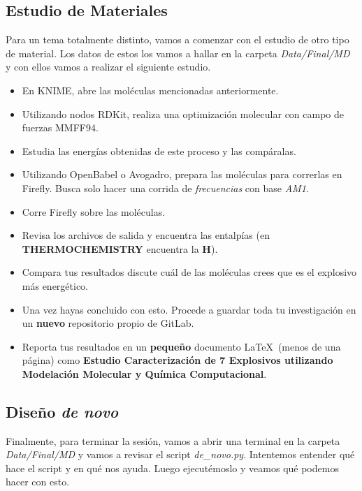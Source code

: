 \documentclass[10pt,letterpaper]{article}
\begin{document}
\subsection{Estudio de Materiales}
Para un tema totalmente distinto, vamos a comenzar con el estudio de otro tipo de material. Los datos de estos los vamos a hallar en la carpeta \textit{Data/Final/MD} y con ellos vamos a realizar el siguiente estudio.

\begin{itemize}
\item En KNIME, abre las mol\'eculas mencionadas anteriormente.
\item Utilizando nodos RDKit, realiza una optimizaci\'on molecular con campo de fuerzas MMFF94.
\item Estudia las energ\'ias obtenidas de este proceso y las comp\'aralas.
\item Utilizando OpenBabel o Avogadro, prepara las mol\'eculas para correrlas en Firefly. Busca solo hacer una corrida de \emph{frecuencias} con base \emph{AM1}.
\item Corre Firefly sobre las mol\'eculas.
\item Revisa los archivos de salida y encuentra las entalp\'ias (en \textbf{THERMOCHEMISTRY} encuentra la \textbf{H}).
\item Compara tus resultados discute cu\'al de las mol\'eculas crees que es el explosivo m\'as energ\'etico.
\item Una vez hayas concluido con esto. Procede a guardar toda tu investigaci\'on en un \textbf{nuevo} repositorio propio de GitLab.
\item Reporta tus resultados en un \textbf{peque\~no} documento \LaTeX\ (menos de una p\'agina) como \textbf{Estudio Caracterizaci\'on de 7 Explosivos utilizando Modelaci\'on Molecular y Qu\'imica Computacional}.
\end{itemize}

\subsection{Dise\~no \emph{de novo}}
Finalmente, para terminar la sesi\'on, vamos a abrir una terminal en la carpeta \textit{Data/Final/MD} y vamos a revisar el script \textit{de\_novo.py}. Intentemos entender qu\'e hace el script y en qu\'e nos ayuda. Luego ejecut\'emoslo y veamos qu\'e podemos hacer con esto.
\end{document}
